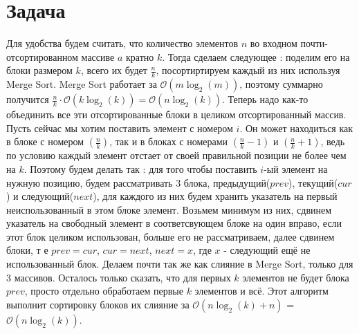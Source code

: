 \documentclass{article}
\begin{document}
\section*{Задача }
Для удобства будем считать, что количество элементов $n$ во входном почти-отсортированном массиве $a$ кратно $k$. Тогда сделаем следующее : поделим его на блоки размером $k$, всего их будет $\frac{n}{k}$, посортиртируем каждый из них используя Merge Sort. Merge Sort работает за $\mathcal{O}(m\log_{2}(m))$, поэтому суммарно получится $\frac{n}{k} \cdot \mathcal{O}(k\log_{2}(k)) = \mathcal{O}(n\log_{2}(k))$. Теперь надо как-то объединить все эти отсортированные блоки в целиком отсортированный массив. Пусть сейчас мы хотим поставить элемент с номером $i$. Он может находиться как в блоке с номером $(\frac{n}{k})$, так и в блоках с номерами $(\frac{n}{k} - 1)$ и $(\frac{n}{k} + 1)$, ведь по условию каждый элемент отстает от своей правильной позиции не более чем на $k$. Поэтому будем делать так : для того чтобы поставить $i$-ый элемент на нужную позицию, будем рассматривать 3 блока, предыдущий($prev$), текущий($cur$) и следующий($next$), для каждого из них будем хранить указатель на первый неиспользованный в этом блоке элемент. Возьмем минимум из них, сдвинем указатель на свободный элемент в соответсвующем блоке на один вправо, если этот блок целиком использован, больше его не рассматриваем, далее сдвинем блоки, т е $prev = cur$, $cur = next$, $next =  x$, где $x$ - следующий ещё не использованный блок. Делаем почти так же как слияние в Merge Sort, только для 3 массивов. Осталось только сказать, что для первых $k$ элементов не будет блока $prev$, просто отдельно обработаем первые $k$ элементов и всё. Этот алгоритм выполнит сортировку блоков их слияние за $\mathcal{O}(n\log_{2}(k) + n)$ = $\mathcal{O}(n\log_{2}(k))$.
\end{document}
